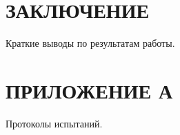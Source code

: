 \section*{ЗАКЛЮЧЕНИЕ}

Краткие выводы по результатам работы.

\section*{ПРИЛОЖЕНИЕ А} %

Протоколы испытаний.
